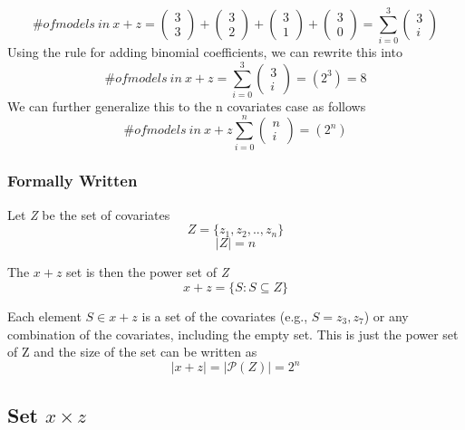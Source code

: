 \[\# of models\ in\ x + z = \left( \begin{array}{c}
3 \\ 
3 \end{array}
\right)+\left( \begin{array}{c}
3 \\ 
2 \end{array}
\right)+\left( \begin{array}{c}
3 \\ 
1 \end{array}
\right)+\left( \begin{array}{c}
3 \\ 
0 \end{array}
\right)=\sum^3_{i=0}{\left( \begin{array}{c}
3 \\ 
i \end{array}
\right)}\] 
Using the rule for adding binomial coefficients, we can rewrite this into
\[\# of models\ in\ x + z = \sum^3_{i=0}{\left( \begin{array}{c}
3 \\ 
i \end{array}
\right)}=\left(2^3\right)=8\] 
We can further generalize this to the n covariates case as follows 
\[\# of models\ in\ x + z\sum^n_{i=0}{\left( \begin{array}{c}
n \\ 
i \end{array}
\right)}=\left(2^n\right)\] 

\subsubsection{Formally Written} \break 
\noindent Let \emph{Z} be the set of covariates 
\[Z=\{\left.z_1,z_2,..,z_n\right.\}\] 
\[\left|Z\right|=n\] 


\noindent The $x + z$ set is then the power set of \emph{Z} 
\[x + z = \{\left.S:S\subseteq Z\right.\}\] 

Each element $S\in x + z$ is a set of the covariates (e.g., $S=\left.z_3,z_7\right.$) or any combination of the covariates, including the empty set. This is just the power set of Z and the size of the set can be written as
\[\left|x + z\right|=|\mathcal{P}\left(Z\right)|=2^n\] 

\subsection{Set $x \times z$}

